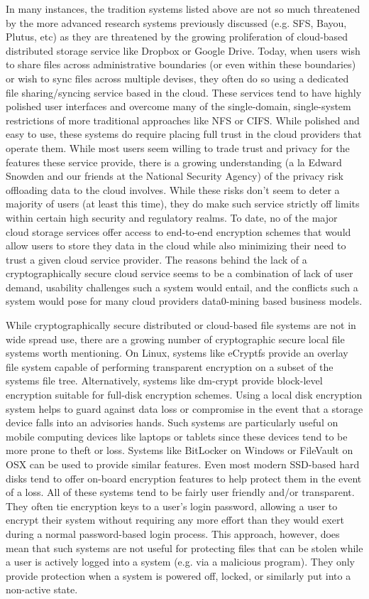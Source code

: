 \documentclass{sig-alternate}
\begin{document}
In many instances, the tradition systems listed above are not so much
threatened by the more advanced research systems previously discussed
(e.g. SFS, Bayou, Plutus, etc) as they are threatened by the growing
proliferation of cloud-based distributed storage service like Dropbox
or Google Drive. Today, when users wish to share files across
administrative boundaries (or even within these boundaries) or wish to
sync files across multiple devises, they often do so using a dedicated
file sharing/syncing service based in the cloud. These services tend
to have highly polished user interfaces and overcome many of the
single-domain, single-system restrictions of more traditional
approaches like NFS or CIFS. While polished and easy to use, these
systems do require placing full trust in the cloud providers that
operate them. While most users seem willing to trade trust and privacy
for the features these service provide, there is a growing
understanding (a la Edward Snowden and our friends at the National
Security Agency) of the privacy risk offloading data to the cloud
involves. While these risks don't seem to deter a majority of users
(at least this time), they do make such service strictly off limits
within certain high security and regulatory realms. To date, no of the
major cloud storage services offer access to end-to-end encryption
schemes that would allow users to store they data in the cloud while
also minimizing their need to trust a given cloud service
provider. The reasons behind the lack of a cryptographically secure
cloud service seems to be a combination of lack of user demand,
usability challenges such a system would entail, and the conflicts
such a system would pose for many cloud providers data0-mining based
business models.

While cryptographically secure distributed or cloud-based file systems
are not in wide spread use, there are a growing number of
cryptographic secure local file systems worth mentioning. On Linux,
systems like eCryptfs provide an overlay file system capable of
performing transparent encryption on a subset of the systems file
tree. Alternatively, systems like dm-crypt provide block-level
encryption suitable for full-disk encryption schemes. Using a local
disk encryption system helps to guard against data loss or compromise
in the event that a storage device falls into an advisories
hands. Such systems are particularly useful on mobile computing
devices like laptops or tablets since these devices tend to be more
prone to theft or loss. Systems like BitLocker on Windows or FileVault
on OSX can be used to provide similar features. Even most modern
SSD-based hard disks tend to offer on-board encryption features to
help protect them in the event of a loss. All of these systems tend to
be fairly user friendly and/or transparent. They often tie encryption
keys to a user's login password, allowing a user to encrypt their
system without requiring any more effort than they would exert during
a normal password-based login process. This approach, however, does
mean that such systems are not useful for protecting files that can be
stolen while a user is actively logged into a system (e.g. via a
malicious program). They only provide protection when a system is
powered off, locked, or similarly put into a non-active state.
\end{document}
